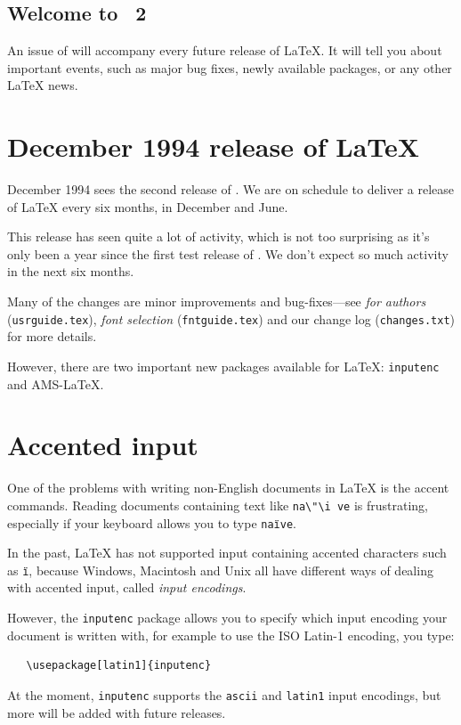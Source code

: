 \documentclass{ltnews}
\providecommand\pkg[1]{\texttt{#1}}
\begin{document}
\maketitle

\subsection{Welcome to \LaTeXNews~2}

An issue of \emph{\LaTeXNews} will accompany every future release of
\LaTeX.  It will tell you about important events, such as major bug
fixes, newly available packages, or any other \LaTeX{} news.

\section{December 1994 release of \LaTeX}

December 1994 sees the second release of \LaTeXe.  We are on schedule
to deliver a release of \LaTeX{} every six months, in December and
June.

This release has seen quite a lot of activity, which is not too
surprising as it's only been a year since the first test release of
\LaTeXe.  We don't expect so much activity in the next six months.

Many of the changes are minor improvements and bug-fixes---see
\emph{\LaTeXe{} for authors} (\verb|usrguide.tex|), \emph{\LaTeXe{}
font selection} (\verb|fntguide.tex|) and our change log
(\verb|changes.txt|) for more details.

However, there are two important new packages available for \LaTeX:
\pkg{inputenc} and AMS-\LaTeX.

\section{Accented input}

One of the problems with writing non-English documents in \LaTeX{} is
the accent commands.  Reading documents containing text like
\verb|na\"\i ve| is frustrating, especially if your keyboard allows
you to type \texttt{na\"\i ve}.

In the past, \LaTeX{} has not supported input containing accented
characters such as \texttt{\"\i}, because Windows, Macintosh and Unix
all have different ways of dealing with accented input, called
\emph{input encodings}.

However, the \verb|inputenc| package allows you to specify which input
encoding your document is written with, for example to use the ISO
Latin-1 encoding, you type:
\begin{verbatim}
   \usepackage[latin1]{inputenc}
\end{verbatim}
At the moment, \verb|inputenc| supports the \verb|ascii| and
\verb|latin1| input encodings, but more will be added with future
releases.
\end{document}
